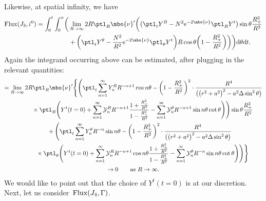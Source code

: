 Likewise, at spatial infinity, we have
\begin{align*}
{\rm Flux} (J_3, \bar{\iota}^0)= \int^t_0 \int^\pi _0 \biggl(&\lim_{R \to \infty} 2 R \ptl_R \mbo{\nu}' \biggl(\bigl(\ptl_t Y^R - N^2 {\rm e}^{-2 \mbo{\nu}} \ptl_R Y^t\bigr) \sin \theta \frac{R^2_+}{R^2} \notag\\
&{} + \biggl(\ptl_t Y^\theta - \frac{N^2}{R^2} {\rm e}^{-2 \mbo{\nu}} \ptl_\theta Y^t\biggr) R \cos \theta \biggl(1-\frac{R^2_+}{R^2}\biggr) \biggr) \biggr) {\rm d}\theta {\rm d}t.
\end{align*}
Again the integrand occurring above can be estimated, after plugging in the relevant quantities:
\begin{gather*}
= \lim_{R \to \infty} 2R \ptl_R \mbo{\nu}' \Bigg\{ \Biggl(\ptl_t \sum^\infty_{n=1} Y^R_n R^{-n+1} \cos n \theta - \biggl(1 - \frac{R^2_+}{R^2} \biggr)^2 \cdot \frac{R^4}{ \bigl( \bigl(r^2+a^2\bigr)^2 -a^2 \Delta \sin^2 \theta\bigr)} \\
 \qquad\quad{} \times \ptl_R \Biggl(Y^t(t=0) + \sum^\infty_{n =1} \mathcal{Y}^R_n R^{-n+1} \frac{1+ \frac{R^2_+}{R^2}}{1-\frac{R^2_+}{R^2}} - \sum^\infty_{n=1} \mathcal{Y}^\theta_n R^{-n+1} \sin n \theta \cot \theta \Biggr) \Biggr)\sin \theta \frac{R^2_+}{R^2} \notag\\
 \qquad{} + \Biggl( \ptl_t \sum^{\infty}_{n=1} Y^\theta_n R^{-n} \sin n \theta - \biggl(1- \frac{R^2_+}{R^2}\biggr)^2 \cdot \frac{R^4}{ \bigl(\bigl(r^2+a^2\bigr)^2 -a^2 \Delta
	\sin^2 \theta \bigr)} \notag\\
 \qquad\quad{} \times \ptl_\theta \Biggl(Y^t (t=0) + \sum^\infty_{n=1} \mathcal{Y}^R_n R^{-n+1} \cos n \theta \frac{1 + \frac{R^2_+}{R^2}} {{1-\frac{R^2_+}{R^2}} } - \sum^\infty_{n=1} \mathcal{Y}^\theta_n R^{-n} \sin n \theta \cot \theta \Biggr) \Biggr) \Bigg\} \notag\\
 \to 0 \qquad \text{as} \ R \to \infty.
\end{gather*}
We would like to point out that the choice of $Y^t(t=0)$ is at our discretion.
Next, let us consider~${\rm Flux} (J_4, \Gamma)$.

